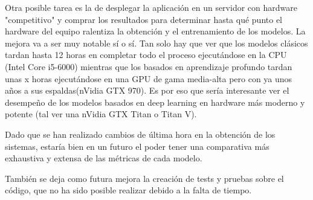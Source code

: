 Otra posible tarea es la de desplegar la aplicación en un servidor con hardware "competitivo" y comprar los resultados para determinar hasta qué punto el hardware del equipo ralentiza la obtención y el entrenamiento de los modelos. La mejora va a ser muy notable sí o sí. Tan solo hay que ver que los modelos clásicos tardan hasta 12 horas en completar todo el proceso ejecutándose en la CPU (Intel Core i5-6000) mientras que los basados en aprendizaje profundo tardan unas x horas ejecutándose en una GPU de gama media-alta pero con ya unos años a sus espaldas(nVidia GTX 970). Es por eso que sería interesante ver el desempeño de los modelos basados en deep learning en hardware más moderno y potente (tal ver una nVidia GTX Titan o Titan V).

Dado que se han realizado cambios de última hora en la obtención de los sistemas, estaría bien en un futuro el poder tener una comparativa más exhaustiva y extensa de las métricas de cada modelo.

También se deja como futura mejora la creación de tests y pruebas sobre el código, que no ha sido posible realizar debido a la falta de tiempo.